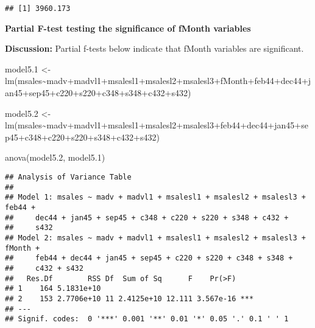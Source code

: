 \documentclass[
]{article}
\newenvironment{Shaded}{\begin{snugshade}}{\end{snugshade}}
\newcommand{\FloatTok}[1]{\textcolor[rgb]{0.00,0.00,0.81}{#1}}
\newcommand{\FunctionTok}[1]{\textcolor[rgb]{0.00,0.00,0.00}{#1}}
\newcommand{\NormalTok}[1]{#1}
\newcommand{\OtherTok}[1]{\textcolor[rgb]{0.56,0.35,0.01}{#1}}
\newcommand{\SpecialCharTok}[1]{\textcolor[rgb]{0.00,0.00,0.00}{#1}}
\begin{document}
\begin{verbatim}
## [1] 3960.173
\end{verbatim}

\textbf{Partial F-test testing the significance of fMonth variables}

\textbf{Discussion:} Partial f-tests below indicate that fMonth
variables are significant.

\begin{Shaded}
\begin{Highlighting}[]
\NormalTok{model5}\FloatTok{.1} \OtherTok{\textless{}{-}} \FunctionTok{lm}\NormalTok{(msales}\SpecialCharTok{\textasciitilde{}}\NormalTok{madv}\SpecialCharTok{+}\NormalTok{madvl1}\SpecialCharTok{+}\NormalTok{msalesl1}\SpecialCharTok{+}\NormalTok{msalesl2}\SpecialCharTok{+}\NormalTok{msalesl3}\SpecialCharTok{+}\NormalTok{fMonth}\SpecialCharTok{+}\NormalTok{feb44}\SpecialCharTok{+}\NormalTok{dec44}\SpecialCharTok{+}\NormalTok{jan45}\SpecialCharTok{+}\NormalTok{sep45}\SpecialCharTok{+}\NormalTok{c220}\SpecialCharTok{+}\NormalTok{s220}\SpecialCharTok{+}\NormalTok{c348}\SpecialCharTok{+}\NormalTok{s348}\SpecialCharTok{+}\NormalTok{c432}\SpecialCharTok{+}\NormalTok{s432)}

\NormalTok{model5}\FloatTok{.2} \OtherTok{\textless{}{-}} \FunctionTok{lm}\NormalTok{(msales}\SpecialCharTok{\textasciitilde{}}\NormalTok{madv}\SpecialCharTok{+}\NormalTok{madvl1}\SpecialCharTok{+}\NormalTok{msalesl1}\SpecialCharTok{+}\NormalTok{msalesl2}\SpecialCharTok{+}\NormalTok{msalesl3}\SpecialCharTok{+}\NormalTok{feb44}\SpecialCharTok{+}\NormalTok{dec44}\SpecialCharTok{+}\NormalTok{jan45}\SpecialCharTok{+}\NormalTok{sep45}\SpecialCharTok{+}\NormalTok{c348}\SpecialCharTok{+}\NormalTok{c220}\SpecialCharTok{+}\NormalTok{s220}\SpecialCharTok{+}\NormalTok{s348}\SpecialCharTok{+}\NormalTok{c432}\SpecialCharTok{+}\NormalTok{s432)}

\FunctionTok{anova}\NormalTok{(model5}\FloatTok{.2}\NormalTok{, model5}\FloatTok{.1}\NormalTok{)}
\end{Highlighting}
\end{Shaded}

\begin{verbatim}
## Analysis of Variance Table
## 
## Model 1: msales ~ madv + madvl1 + msalesl1 + msalesl2 + msalesl3 + feb44 + 
##     dec44 + jan45 + sep45 + c348 + c220 + s220 + s348 + c432 + 
##     s432
## Model 2: msales ~ madv + madvl1 + msalesl1 + msalesl2 + msalesl3 + fMonth + 
##     feb44 + dec44 + jan45 + sep45 + c220 + s220 + c348 + s348 + 
##     c432 + s432
##   Res.Df        RSS Df  Sum of Sq      F    Pr(>F)    
## 1    164 5.1831e+10                                   
## 2    153 2.7706e+10 11 2.4125e+10 12.111 3.567e-16 ***
## ---
## Signif. codes:  0 '***' 0.001 '**' 0.01 '*' 0.05 '.' 0.1 ' ' 1
\end{verbatim}
\end{document}
